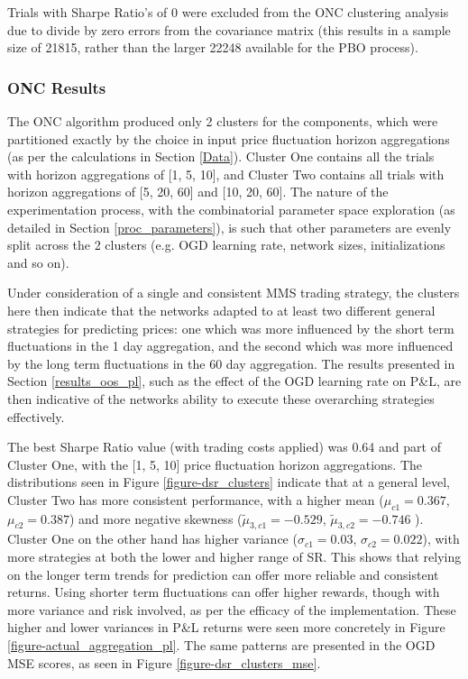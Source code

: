 \documentclass[a4paper,11pt,oneside]{article}
\theoremstyle{plain}
\theoremstyle{definition}
\begin{document}
	Trials with Sharpe Ratio's of 0 were excluded from the ONC clustering analysis due to divide by zero errors from the covariance matrix (this results in a sample size of 21815, rather than the larger 22248 available for the PBO process).
	
	\subsubsection{ONC Results}\label{results_onc}
	
	The ONC algorithm produced only 2 clusters for the components, which were partitioned exactly by the choice in input price fluctuation horizon aggregations (as per the calculations in Section \ref{Data}). Cluster One contains all the trials with horizon aggregations of [1, 5, 10], and Cluster Two contains all trials with horizon aggregations of [5, 20, 60] and [10, 20, 60]. The nature of the experimentation process, with the combinatorial parameter space exploration (as detailed in Section \ref{proc_parameters}), is such that other parameters are evenly split across the 2 clusters (e.g. OGD learning rate, network sizes, initializations and so on).\newline
	
	Under consideration of a single and consistent MMS trading strategy, the clusters here then indicate that the networks adapted to at least two different general strategies for predicting prices: one which was more influenced by the short term fluctuations in the 1 day aggregation, and the second which was more influenced by the long term fluctuations in the 60 day aggregation. The results presented in Section \ref{results_oos_pl}, such as the effect of the OGD learning rate on P\&L, are then indicative of the networks ability to execute these overarching strategies effectively. \newline
	
	The best Sharpe Ratio value (with trading costs applied) was 0.64 and part of Cluster One, with the [1, 5, 10] price fluctuation horizon aggregations. The distributions seen in Figure \ref{figure-dsr_clusters} indicate that at a general level, Cluster Two has more consistent performance, with a higher mean ($\mu_{c1} = 0.367$, $\mu_{c2} = 0.387$) and more negative skewness ($\tilde{\mu}_{3,c1} = -0.529$, $\tilde{\mu}_{3,c2} = -0.746$ ). Cluster One on the other hand has higher variance ($\sigma_{c1} = 0.03$, $\sigma_{c2} = 0.022$), with more strategies at both the lower and higher range of SR. This shows that relying on the longer term trends for prediction can offer more reliable and consistent returns. Using shorter term fluctuations can offer higher rewards, though with more variance and risk involved, as per the efficacy of the implementation. These higher and lower variances in P\&L returns were seen more concretely in Figure \ref{figure-actual_aggregation_pl}. The same patterns are presented in the OGD MSE scores, as seen in Figure \ref{figure-dsr_clusters_mse}.\newline
\end{document}
